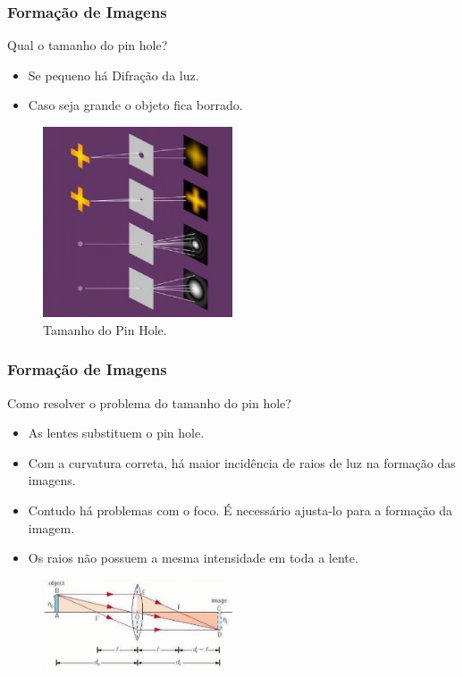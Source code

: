 \documentclass{beamer}
\begin{document}
\begin{frame}
\frametitle{Formação de Imagens}

	\begin{block}{Qual o tamanho do pin hole?}
		\begin{itemize}
			\item Se pequeno há Difração da luz.
			\item Caso seja grande o objeto fica borrado.
		\end{itemize}
	\end{block}
	
	\begin{figure}[htb!]
  		\centering
      		\includegraphics[width=0.5\textwidth]{Figures/pinHole}
      		\caption{Tamanho do Pin Hole.}
  		\label{iep}
	\end{figure}

\end{frame}


\begin{frame}
\frametitle{Formação de Imagens}

	\begin{block}{Como resolver o problema do tamanho do pin hole?}
		\begin{itemize}
			\item As lentes substituem o pin hole.
			\item Com a curvatura correta, há maior incidência de raios de luz na formação das imagens.
			\item Contudo há problemas com o foco. É necessário ajusta-lo para a formação da imagem.
			\item Os raios não possuem a mesma intensidade em toda a lente.
		\end{itemize}
	\end{block}
	
	\begin{figure}[htb!]
  		\centering
      		\includegraphics[width=0.5\textwidth]{Figures/lente}
  		\label{iep}
	\end{figure}

\end{frame}
\end{document}
